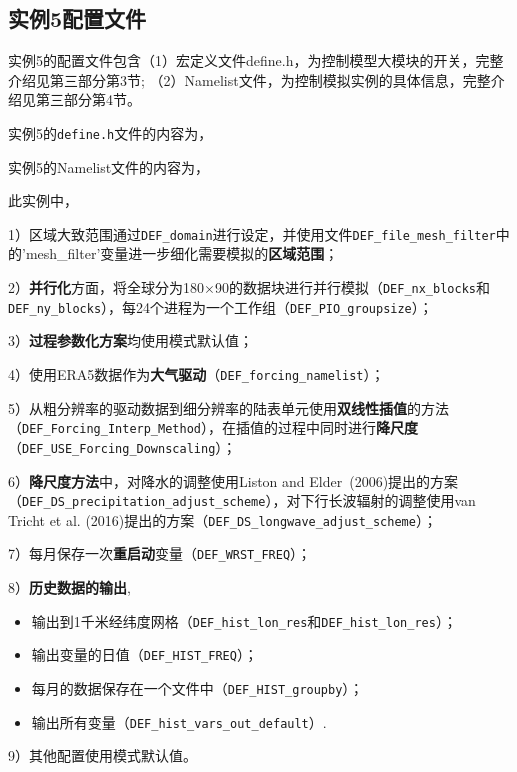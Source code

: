 \subsection{实例5配置文件}
实例5的配置文件包含（1）宏定义文件define.h，为控制模型大模块的开关，完整介绍见第三部分第3节; （2）Namelist文件，为控制模拟实例的具体信息，完整介绍见第三部分第4节。

实例5的\texttt{define.h}文件的内容为，


实例5的Namelist文件的内容为，


此实例中，\par
1）区域大致范围通过\texttt{DEF\_domain}进行设定，并使用文件\texttt{DEF\_file\_mesh\_filter}中的'mesh\_filter'变量进一步细化需要模拟的\textbf{区域范围}；\par
2）\textbf{并行化}方面，将全球分为180\textdegree$\times$90\textdegree 的数据块进行并行模拟（\texttt{DEF\_nx\_blocks}和\texttt{DEF\_ny\_blocks}），每24个进程为一个工作组（\texttt{DEF\_PIO\_groupsize}）；\par
3）\textbf{过程参数化方案}均使用模式默认值；\par
4）使用ERA5数据作为\textbf{大气驱动}（\texttt{DEF\_forcing\_namelist}）；\par
5）从粗分辨率的驱动数据到细分辨率的陆表单元使用\textbf{双线性插值}的方法\\ （\texttt{DEF\_Forcing\_Interp\_Method}），在插值的过程中同时进行\textbf{降尺度}\\ （\texttt{DEF\_USE\_Forcing\_Downscaling}）；\par
6）\textbf{降尺度方法}中，对降水的调整使用Liston and Elder~(2006)提出的方案\\ （\texttt{DEF\_DS\_precipitation\_adjust\_scheme}），对下行长波辐射的调整使用van Tricht et al. (2016)提出的方案（\texttt{DEF\_DS\_longwave\_adjust\_scheme}）；\par
7）每月保存一次\textbf{重启动}变量（\texttt{DEF\_WRST\_FREQ}）；\par
8）\textbf{历史数据的输出},
\begin{itemize}[nosep,leftmargin=4em]
    \item 输出到1千米经纬度网格（\texttt{DEF\_hist\_lon\_res}和\texttt{DEF\_hist\_lon\_res}）；
    \item 输出变量的日值（\texttt{DEF\_HIST\_FREQ}）；
    \item 每月的数据保存在一个文件中（\texttt{DEF\_HIST\_groupby}）；
    \item 输出所有变量（\texttt{DEF\_hist\_vars\_out\_default}）.
\end{itemize}\par
9）其他配置使用模式默认值。

